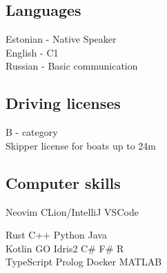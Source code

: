 \documentclass[]{deedy-resume-openfont}
\begin{document}
\begin{minipage}[t]{0.33\textwidth}
\subsection{Languages}

Estonian - Native Speaker \\
English - C1 \\
Russian - Basic communication \\

\sectionspace %


\subsection{Driving licenses}

B - category \\
Skipper license for boats up to 24m \\

\sectionspace %

\subsection{Computer skills}

Neovim \textbullet{} CLion/IntelliJ \textbullet{} VSCode \\

\sectionspace

Rust \textbullet{} C++ \textbullet{} Python \textbullet{} Java \\
Kotlin \textbullet{} GO \textbullet{} Idris2 \textbullet{} C\# \textbullet{} F\# \textbullet{} R \\
TypeScript \textbullet{} Prolog \textbullet{} Docker \textbullet{} MATLAB


\sectionspace %


\end{minipage} %
\hfill
%
%
\end{document}
